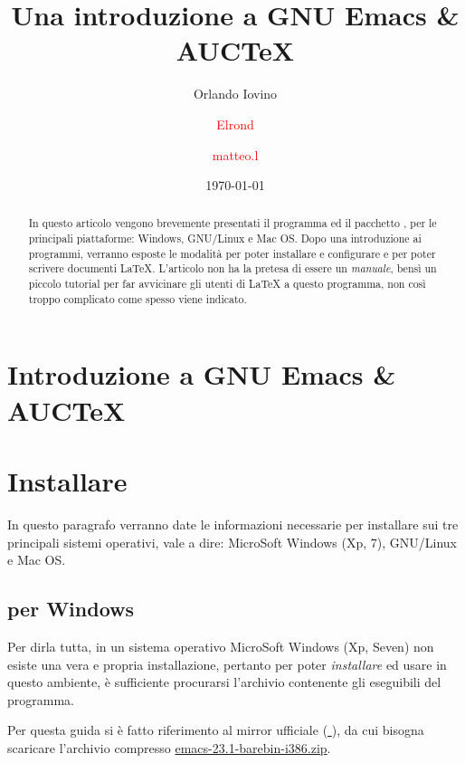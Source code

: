 \documentclass[10pt,a4paper]{article}
\title{Una introduzione a GNU Emacs \& AUC\TeX{}}
\author{Orlando Iovino \and 
\textcolor{red}{Elrond}\and 
\textcolor{red}{matteo.l}}
\date{\today}
\begin{document}
 
\maketitle
\begin{abstract}
\noindent In questo articolo vengono brevemente presentati il
programma \emacs{} ed il pacchetto \auctex, per le principali
piattaforme: Windows, GNU/Linux e Mac OS. Dopo una introduzione ai programmi,
verranno esposte le modalità per poter installare e configurare
\emacs{} e \auctex{} per poter scrivere     
documenti \LaTeX{}. L'articolo non ha la pretesa di essere un
\emph{manuale}, bensì un piccolo tutorial per far avvicinare gli 
utenti di \LaTeX{} a questo programma, non così troppo complicato 
come spesso viene indicato.
\end{abstract}

\begin{multicols}{2}
  \tableofcontents
\end{multicols}

\section{Introduzione a GNU Emacs \& AUC\TeX}
\label{sec:intro}

\textcolor{red}{\lipsum[1]}

\section{Installare \emacs}
\label{sec:install}

In questo paragrafo verranno date le informazioni necessarie per installare
\emacs{} sui tre principali sistemi operativi, vale a dire: 
\textsf{MicroSoft Windows (Xp, 7)},
\textsf{GNU/Linux} e %
\textsf{Mac OS}.  %

\subsection*{\emacs{} per Windows}
\label{sec:installwin}
Per dirla tutta, in un sistema operativo MicroSoft Windows (Xp, Seven)
non esiste una vera e propria installazione, pertanto per poter
\emph{installare} ed usare \emacs{} in questo ambiente,
è sufficiente procurarsi l'archivio contenente gli eseguibili del programma.

Per questa guida si è fatto riferimento al mirror ufficiale
(\href{http://ftp.gnu.org/pub/gnu/emacs/windows/}{\mano{} \emacs}),
da cui bisogna scaricare l'archivio compresso
\href{http://ftp.gnu.org/pub/gnu/emacs/windows/emacs-23.1-barebin-i386.zip}
{\textsf{emacs-23.1-barebin-i386.zip}}.
\end{document}
